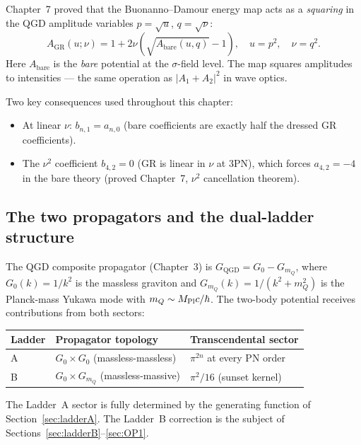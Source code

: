 \documentclass[11pt,a4paper]{article}
\theoremstyle{plain}
\theoremstyle{definition}
\theoremstyle{remark}
\newcommand{\mQ}{m_Q}
\newcommand{\GR}{\mathrm{GR}}
\newcommand{\bA}{\mathrm{bare}}
\newcommand{\QGD}{\mathrm{QGD}}
\begin{document}
Chapter~7 proved that the Buonanno--Damour energy map acts as a
\emph{squaring} in the QGD amplitude variables $p=\sqrt{u}$,
$q=\sqrt{\nu}$:
\begin{equation}
  A_{\GR}(u;\nu) = 1 + 2\nu\!\left(\sqrt{A_{\bA}(u,q)}-1\right),
  \quad u = p^2,\quad \nu = q^2.
  \label{eq:BD}
\end{equation}
Here $A_{\bA}$ is the \emph{bare} potential at the $\sigma$-field level.
The map squares amplitudes to intensities --- the same operation as
$|A_1+A_2|^2$ in wave optics.

Two key consequences used throughout this chapter:
\begin{itemize}[nosep]
  \item At linear $\nu$: $b_{n,1} = a_{n,0}$ (bare coefficients are
    exactly half the dressed GR coefficients).
  \item The $\nu^2$ coefficient $b_{4,2}=0$ (GR is linear in $\nu$ at
    3PN), which forces $a_{4,2} = -4$ in the bare theory (proved
    Chapter~7, $\nu^2$ cancellation theorem).
\end{itemize}

\subsection{The two propagators and the dual-ladder structure}

The QGD composite propagator (Chapter~3) is
$G_{\QGD} = G_0 - G_{\mQ}$, where $G_0(k)=1/k^2$ is the massless
graviton and $G_{\mQ}(k)=1/(k^2+\mQ^2)$ is the Planck-mass Yukawa
mode with $\mQ\sim M_{\rm Pl}c/\hbar$.  The two-body potential
receives contributions from both sectors:

\begin{center}
\renewcommand{\arraystretch}{1.4}
\begin{tabular}{p{2.4cm}p{5.2cm}p{5.2cm}}
\toprule
Ladder & Propagator topology & Transcendental sector \\
\midrule
A & $G_0\times G_0$ (massless-massless) & $\pi^{2n}$ at every PN order \\
B & $G_0\times G_{\mQ}$ (massless-massive) & $\pi^2/16$ (sunset kernel) \\
\bottomrule
\end{tabular}
\end{center}

The Ladder~A sector is fully determined by the generating function of
Section~\ref{sec:ladderA}.  The Ladder~B correction is the subject of
Sections~\ref{sec:ladderB}--\ref{sec:OP1}.
\end{document}
